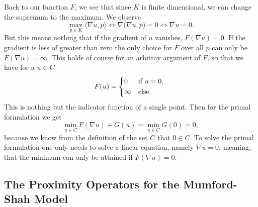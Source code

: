 	    Back to our function $F$, we see that since $K$ is finite dimensional, we can change the supremum to the maximum. We observe
	    	$$
	    		\max_{p \in K} \langle \nabla u, p \rangle \Longleftrightarrow \nabla \big( \nabla u, p \big) = 0 \Longleftrightarrow \nabla u = 0.
	    	$$
	    But this means nothing that if the gradient of $u$ vanishes, $F(\nabla u) = 0$. If the gradient is less of greater than zero the only choice for $F$ over all $p$ can only be $F(\nabla u) = \infty$. This holds of course for an arbitray argument of $F$, so that we have for a $u \in C$
	    	$$
	    		F(u) =
	    			\begin{dcases*}
	    				0 & \textnormal{if $u = 0$,} \\
	    				\infty & \textnormal{else.}
	    			\end{dcases*}
	    	$$
    	This is nothing but the indicator function of a single point. Then for the primal formulation we get
	    	\begin{equation}
	    		\min_{u \in C} F(\nabla u) + G(u) = \min_{u \in C} G(0) = 0,
	    		\label{eq:primal_mumford_shah}
	    	\end{equation}
	    because we know from the definition of the set $C$ that $0 \in C$. To solve the primal formulation one only needs to solve a linear equation, namely $\nabla u = 0$, meaning, that the minimum can only be attained if $F(\nabla u) = 0$.




    \subsection{The Proximity Operators for the Mumford-Shah Model} %
    \label{sub:the_proximity_operators_for_the_mumford_shah_model}
    	
